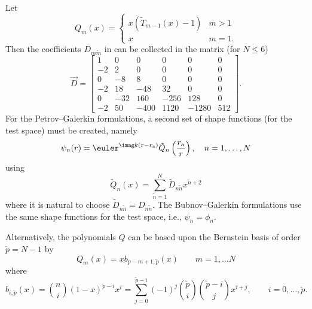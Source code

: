 Let
\begin{equation}
	Q_m(x) = \begin{cases}x\left(\tilde{T}_{m-1}(x)-1\right)& m>1\\
				x & m=1.
				\end{cases}
\end{equation}
Then the coefficients $D_{m\tilde{m}}$ in  can be collected in the matrix (for $N \leq 6$)
\begin{equation*}
	\vec{D} = \begin{bmatrix}
		1 & 0 & 0 & 0 & 0 & 0\\
		-2 & 2 & 0 & 0 & 0 & 0\\	
		0 & -8 & 8 & 0 & 0 & 0\\
		-2 & 18 & -48 & 32 & 0 & 0\\
		0 & -32 & 160 & -256 & 128 & 0\\
		-2 & 50 & -400 & 1120 & -1280 & 512
	\end{bmatrix}.
\end{equation*}
For the Petrov--Galerkin formulations, a second set of shape functions (for the test space) must be created, namely
\begin{equation}
	\psi_n(r) = \euler^{\imag k (r-r_{\mathrm{a}})}\tilde{Q}_n\left(\frac{r_{\mathrm{a}}}{r}\right),\quad n = 1,\dots,N
\end{equation}
using
\begin{equation}
	\tilde{Q}_n(x) = \sum_{\tilde{n}=1}^N \tilde{D}_{n\tilde{n}} x^{\tilde{n}+2}
\end{equation}
where it is natural to choose $\tilde{D}_{n\tilde{n}}=D_{n\tilde{n}}$. The Bubnov--Galerkin formulations use the same shape functions for the test space, i.e., $\psi_n = \phi_n$.

Alternatively, the polynomials $Q$ can be based upon the Bernstein basis of order $\check{p}=N-1$ by
\begin{equation}
	Q_m(x) = xb_{p-m+1,\check{p}}(x)\qquad m=1,\dots N
\end{equation}
where
\begin{equation}
	b_{i,\check{p}}(x) = \binom{n}{i}(1-x)^{\check{p}-i}x^i = \sum_{j=0}^{\check{p}-i}(-1)^j\binom{\check{p}}{i}\binom{\check{p}-i}{j} x^{i+j},\qquad i=0,\dots,\check{p}.
\end{equation}

